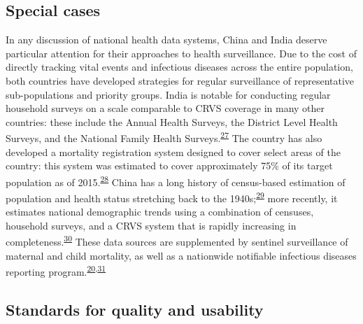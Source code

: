 \documentclass[
]{article}
\begin{document}
\hypertarget{special-cases}{%
\subsection{Special cases}\label{special-cases}}

In any discussion of national health data systems, China and India deserve particular attention for their approaches to health surveillance. Due to the cost of directly tracking vital events and infectious diseases across the entire population, both countries have developed strategies for regular surveillance of representative sub-populations and priority groups. India is notable for conducting regular household surveys on a scale comparable to CRVS coverage in many other countries: these include the Annual Health Surveys, the District Level Health Surveys, and the National Family Health Surveys.\textsuperscript{\protect\hyperlink{ref-Dandona2016}{27}} The country has also developed a mortality registration system designed to cover select areas of the country: this system was estimated to cover approximately 75\% of its target population as of 2015.\textsuperscript{\protect\hyperlink{ref-Kumar2019}{28}} China has a long history of census-based estimation of population and health status stretching back to the 1940s;\textsuperscript{\protect\hyperlink{ref-Banister2004}{29}} more recently, it estimates national demographic trends using a combination of censuses, household surveys, and a CRVS system that is rapidly increasing in completeness.\textsuperscript{\protect\hyperlink{ref-Zeng2020}{30}} These data sources are supplemented by sentinel surveillance of maternal and child mortality, as well as a nationwide notifiable infectious diseases reporting program.\textsuperscript{\protect\hyperlink{ref-Vlieg2017}{20},\protect\hyperlink{ref-He2017}{31}}

\hypertarget{standards-for-quality-and-usability}{%
\subsection{Standards for quality and usability}\label{standards-for-quality-and-usability}}
\end{document}
